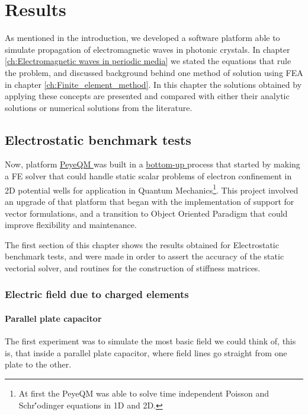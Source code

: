 \chapter{Results}
\label{ch:Results}
As mentioned in the introduction, we developed a software platform able to simulate propagation of electromagnetic waves in photonic crystals. In chapter \ref{ch:Electromagnetic waves in periodic media} we stated the equations that rule the problem, and discussed background behind one method of solution using FEA in chapter \ref{ch:Finite_element_method}. In this chapter the solutions obtained by applying these concepts are presented and compared with either their analytic solutions or numerical solutions from the literature.

\section{Electrostatic benchmark tests}

Now, platform \href{https://github.com/bebopsan/peyeQM}{PeyeQM } was built in a \href{https://en.wikipedia.org/wiki/Top-down_and_bottom-up_design}{bottom-up } process that started by making a FE solver that could handle static scalar problems of electron confinement in 2D potential wells for application in Quantum Mechanics\footnote{At first the PeyeQM was able to solve time independent Poisson and Schr\''odinger equations in 1D and 2D.}. This project involved an upgrade of that platform that began with the implementation of support for vector formulations, and a transition to Object Oriented Paradigm that could improve flexibility and maintenance.

The first section of this chapter shows the results obtained for Electrostatic benchmark tests, and were made in order to assert the accuracy of the static vectorial solver, and  routines for the construction of stiffness matrices.

\subsection{Electric field due to charged elements}
\subsubsection{Parallel plate capacitor}
The first experiment was to simulate the most basic field we could think of, this is, that inside a parallel plate capacitor, where field lines go straight from one plate to the other. 

